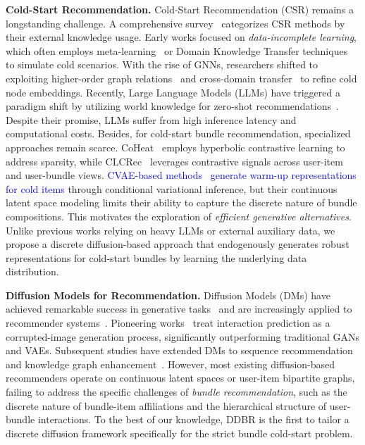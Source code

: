 \documentclass[lettersize,journal]{IEEEtran}
\newcommand{\revise}[1]{\textcolor{blue}{#1}}
\begin{document}
\noindent\textbf{Cold-Start Recommendation.}
Cold-Start Recommendation (CSR) remains a longstanding challenge. A comprehensive survey~\cite{zhang2025cold} categorizes CSR methods by their external knowledge usage. Early works focused on \textit{data-incomplete learning}, which often employs meta-learning~\cite{lee2019melu,wang2023preference,pang2022pnmta} or Domain Knowledge Transfer techniques~\cite{wang2025integrating,vajjala2024vietoris,zhu2022personalized} to simulate cold scenarios. With the rise of GNNs, researchers shifted to exploiting higher-order graph relations~\cite{hu2020heterogeneous} and cross-domain transfer~\cite{zhu2021transfer} to refine cold node embeddings. Recently, Large Language Models (LLMs) have triggered a paradigm shift by utilizing world knowledge for zero-shot recommendations~\cite{bao2023tallrec, wei2024generative,li2025llm,liang2025taxonomy}. Despite their promise, LLMs suffer from high inference latency and computational costs. Besides, for cold-start bundle recommendation, specialized approaches remain scarce. CoHeat~\cite{jeon2024cold} employs hyperbolic contrastive learning to address sparsity, while CLCRec~\cite{wei2021contrastive} leverages contrastive signals across user-item and user-bundle views. \revise{CVAE-based methods~\cite{zhao2022cvae,bai2023gorec} generate warm-up representations for cold items} through conditional variational inference, but their continuous latent space modeling limits their ability to capture the discrete nature of bundle compositions. This motivates the exploration of \textit{efficient generative alternatives}. Unlike previous works relying on heavy LLMs or external auxiliary data, we propose a discrete diffusion-based approach that endogenously generates robust representations for cold-start bundles by learning the underlying data distribution.


\noindent\textbf{Diffusion Models for Recommendation.}
Diffusion Models (DMs) have achieved remarkable success in generative tasks~\cite{ho2020denoising,yang2023diffusion} and are increasingly applied to recommender systems~\cite{ho2020denoising,huang2024dual,jiang2024diffairec,zang2025diffusion}. Pioneering works~\cite{li2023diffurec,bui2025personalized,walker2022recommendation,zhu2025ld4mrec}  treat interaction prediction as a corrupted-image generation process, significantly outperforming traditional GANs and VAEs. Subsequent studies have extended DMs to sequence recommendation~\cite{li2023diffurec,xie2024bridging,qin2023diffusion} and knowledge graph enhancement~\cite{jiang2024diffkg}. However, most existing diffusion-based recommenders operate on continuous latent spaces or user-item bipartite graphs, failing to address the specific challenges of \textit{bundle recommendation}, such as the discrete nature of bundle-item affiliations and the hierarchical structure of user-bundle interactions. To the best of our knowledge, DDBR is the first to tailor a discrete diffusion framework specifically for the strict bundle cold-start problem.
\end{document}
